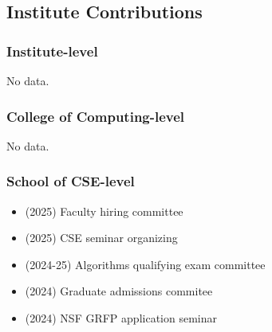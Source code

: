 \begin{adjustwidth}{2em}{0pt}
\subsection{Institute Contributions}

\subsubsection{Institute-level}

\iffalse
\begin{itemize}
    \item (2023) Nice thing here
\end{itemize}
\fi
No data.

\subsubsection{College of Computing-level}
\iffalse
\begin{itemize}
    \item (2023) Nice thing here
\end{itemize}
\fi
No data.

\subsubsection{School of CSE-level}

\begin{itemize}
    \item (2025) Faculty hiring committee
        \item (2025) CSE seminar organizing
    \item (2024-25) Algorithms qualifying exam committee
    \item (2024) Graduate admissions commitee
\item (2024) NSF GRFP application seminar
\end{itemize}

\end{adjustwidth}



